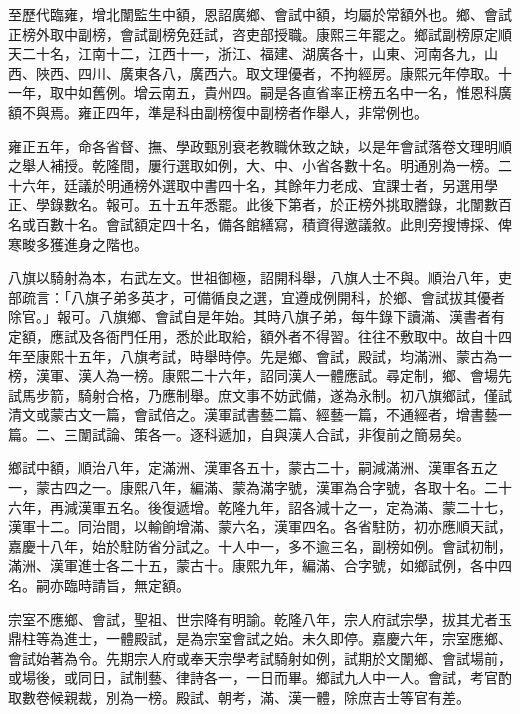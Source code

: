 \begin{pinyinscope}
至歷代臨雍，增北闈監生中額，恩詔廣鄉、會試中額，均屬於常額外也。鄉、會試正榜外取中副榜，會試副榜免廷試，咨吏部授職。康熙三年罷之。鄉試副榜原定順天二十名，江南十二，江西十一，浙江、福建、湖廣各十，山東、河南各九，山西、陜西、四川、廣東各八，廣西六。取文理優者，不拘經房。康熙元年停取。十一年，取中如舊例。增云南五，貴州四。嗣是各直省率正榜五名中一名，惟恩科廣額不與焉。雍正四年，準是科由副榜復中副榜者作舉人，非常例也。

雍正五年，命各省督、撫、學政甄別衰老教職休致之缺，以是年會試落卷文理明順之舉人補授。乾隆間，屢行選取如例，大、中、小省各數十名。明通別為一榜。二十六年，廷議於明通榜外選取中書四十名，其餘年力老成、宜課士者，另選用學正、學錄數名。報可。五十五年悉罷。此後下第者，於正榜外挑取謄錄，北闈數百名或百數十名。會試額定四十名，備各館繕寫，積資得邀議敘。此則旁搜博採、俾寒畯多獲進身之階也。

八旗以騎射為本，右武左文。世祖御極，詔開科舉，八旗人士不與。順治八年，吏部疏言：「八旗子弟多英才，可備循良之選，宜遵成例開科，於鄉、會試拔其優者除官。」報可。八旗鄉、會試自是年始。其時八旗子弟，每牛錄下讀滿、漢書者有定額，應試及各衙門任用，悉於此取給，額外者不得習。往往不敷取中。故自十四年至康熙十五年，八旗考試，時舉時停。先是鄉、會試，殿試，均滿洲、蒙古為一榜，漢軍、漢人為一榜。康熙二十六年，詔同漢人一體應試。尋定制，鄉、會場先試馬步箭，騎射合格，乃應制舉。庶文事不妨武備，遂為永制。初八旗鄉試，僅試清文或蒙古文一篇，會試倍之。漢軍試書藝二篇、經藝一篇，不通經者，增書藝一篇。二、三闈試論、策各一。逐科遞加，自與漢人合試，非復前之簡易矣。

鄉試中額，順治八年，定滿洲、漢軍各五十，蒙古二十，嗣減滿洲、漢軍各五之一，蒙古四之一。康熙八年，編滿、蒙為滿字號，漢軍為合字號，各取十名。二十六年，再減漢軍五名。後復遞增。乾隆九年，詔各減十之一，定為滿、蒙二十七，漢軍十二。同治間，以輸餉增滿、蒙六名，漢軍四名。各省駐防，初亦應順天試，嘉慶十八年，始於駐防省分試之。十人中一，多不逾三名，副榜如例。會試初制，滿洲、漢軍進士各二十五，蒙古十。康熙九年，編滿、合字號，如鄉試例，各中四名。嗣亦臨時請旨，無定額。

宗室不應鄉、會試，聖祖、世宗降有明諭。乾隆八年，宗人府試宗學，拔其尤者玉鼎柱等為進士，一體殿試，是為宗室會試之始。未久即停。嘉慶六年，宗室應鄉、會試始著為令。先期宗人府或奉天宗學考試騎射如例，試期於文闈鄉、會試場前，或場後，或同日，試制藝、律詩各一，一日而畢。鄉試九人中一人。會試，考官酌取數卷候親裁，別為一榜。殿試、朝考，滿、漢一體，除庶吉士等官有差。


\end{pinyinscope}
